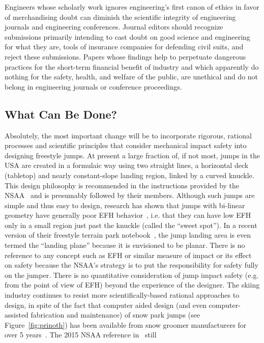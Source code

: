 \documentclass{article}
\begin{document}
Engineers whose scholarly work ignores engineering's first canon of ethics in
favor of merchandising doubt can diminish the scientific integrity of
engineering journals and engineering conferences. Journal editors should
recognize submissions primarily intending to cast doubt on good science and
engineering for what they are, tools of insurance companies for defending civil
suits, and reject these submissions. Papers whose findings help to perpetuate dangerous practices for the short-term financial benefit of industry and which apparently do nothing for the safety, health, and welfare of the public, are unethical and do not
belong in engineering journals or conference proceedings.

\subsection{What Can Be Done?}
\label{sec:action}
%
Absolutely, the most important change will be to incorporate rigorous, rational
processes and scientific principles that consider mechanical impact safety into
designing freestyle jumps.  At present a large fraction of, if not most, jumps
in the USA are created in a formulaic way using two straight lines, a
horizontal deck (tabletop) and nearly constant-slope landing region, linked by
a curved knuckle. This design philosophy is recommended in the instructions
provided by the NSAA~\cite{NSAA2015} and is presumably followed by their
members. Although such jumps are simple and thus easy to design, 
research has shown that jumps with bi-linear geometry have generally poor EFH
behavior~\cite{Swedberg2012}, i.e. that they can have low EFH only in a small
region just past the knuckle (called the ``sweet spot''). In a recent
version of their freestyle terrain park notebook~\cite{NSAA2015}, the jump
landing area is even termed the ``landing plane'' because it is envisioned to be
planar. There is no reference to any concept such as EFH or similar
measure of impact or its effect on safety because the NSAA's strategy is to put
the responsibility for safety fully on the jumper. There is no quantitative
consideration of jump impact safety (e.g. from the point of view of EFH) beyond
the experience of the designer. The skiing industry continues to
resist more scientifically-based rational approaches to design, in spite of the
fact that computer aided design (and even computer-assisted fabrication and
maintenance) of snow park jumps (see Figure~\ref{fig:prinoth}) has been
available from snow groomer manufacturers for over 5
years~\cite{Muigg2019}. The 2015 NSAA reference in~\cite{NSAA2015} still
\end{document}
